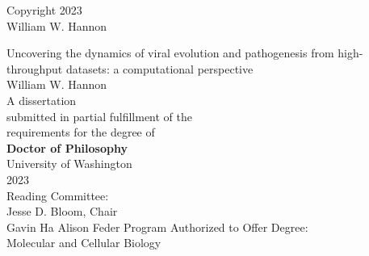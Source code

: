 \documentclass[12pt,oneside,letterpaper]{report}
\begin{document}
\thispagestyle{empty}
\begin{center}
\textcopyright{} Copyright 2023 \\
William W. Hannon
\end{center}
\vspace*{\fill}
\newpage

\thispagestyle{empty}
\begin{center}
\huge{Uncovering the dynamics of viral evolution and pathogenesis from high-throughput datasets: a computational perspective} \\
\vspace{2cm}
\Large{William W. Hannon} \\
\vspace{2cm}
A dissertation \\
submitted in partial fulfillment of the \\
requirements for the degree of \\
\vspace{1cm}
\textbf{Doctor of Philosophy} \\
\vspace{1cm}
University of Washington \\
2023 \\
\vspace{1cm}
Reading Committee: \\
Jesse D. Bloom, Chair \\
Gavin Ha
Alison Feder
\vspace{1cm}
Program Authorized to Offer Degree: \\
Molecular and Cellular Biology
\end{center}
\newpage


\newpage

\newpage

\newpage

\newpage

\newpage

\end{document}
